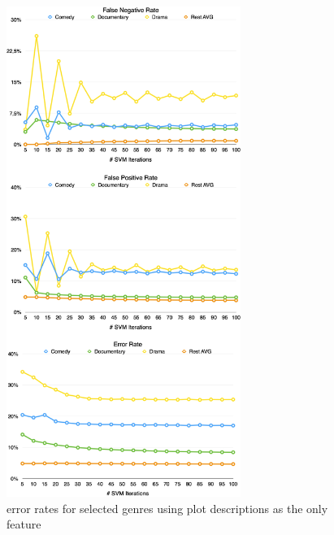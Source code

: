 \documentclass{vldb}
\begin{document}
\begin{figure}
\begin{center}
\includegraphics[width=3.00in]{ErrorRatesPlot.png}
\caption{error rates for selected genres using plot descriptions as the only feature}
\label{fig:ErrorRatesPlot}
\end{center}
\end{figure}
\end{document}
